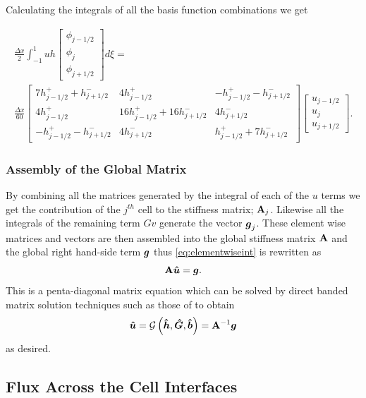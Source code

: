 Calculating the integrals of all the basis function combinations we get

\begin{multline*}
\frac{\Delta x}{2}\int_{-1 }^{1}  uh \begin{bmatrix}
\phi_{j-1/2}\\\phi_j \\\phi_{j+1/2}
\end{bmatrix} d\xi =  \\  \frac{\Delta x}{60} \begin{bmatrix}
7 h^+_{j-1/2} + h^-_{j+1/2} & 4 h^+_{j-1/2}   & - h^+_{j-1/2} - h^-_{j+1/2}\\ 4 h^+_{j-1/2} & 16 h^+_{j-1/2} + 16 h^-_{j+1/2}& 4 h^-_{j+1/2}\\ - h^+_{j-1/2} - h^-_{j+1/2} &  4 h^-_{j+1/2} &  h^+_{j-1/2} + 7 h^-_{j+1/2}
\end{bmatrix}  \begin{bmatrix}
u_{j-1/2}\\u_j \\u _{j+1/2}
\end{bmatrix}.
\end{multline*}

\subsubsection{Assembly of the Global Matrix}
By combining all the matrices generated by the integral of each of the $u$ terms we get the contribution of the $j^{th}$ cell to the stiffness matrix; $\mathbf{A}_j$. Likewise all the integrals of the remaining term $Gv$ generate the vector $\boldsymbol{g}_{j}$. These element wise matrices and vectors are then assembled into the global stiffness matrix $\mathbf{A}$ and the global right hand-side term  $\boldsymbol{g}$ thus \eqref{eq:elementwiseint} is rewritten as
\begin{equation}
\label{eqn:FEMElemMatrixJ}
 \mathbf{A} \boldsymbol{\hat{u}} = \boldsymbol{g}.
\end{equation}
This is a penta-diagonal matrix equation which can be solved by direct banded matrix solution techniques such as those of \citet{NumRecC-1996} to obtain
\begin{equation}
\boldsymbol{\hat{u}} =\mathcal{G}\left( \boldsymbol{\hat{h}}, \boldsymbol{\hat{G}},\boldsymbol{\hat{b}} \right) =   \mathbf{A}^{-1}\boldsymbol{g}
\label{eqn:usolvefromGhb}
\end{equation}
as desired.
\subsection{Flux Across the Cell Interfaces}

